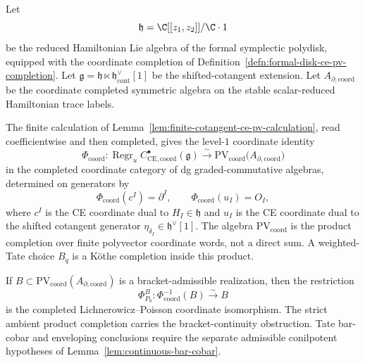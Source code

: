 \documentclass[11pt]{memoir}
\begin{document}
\begin{thm}
\label{thm:reduced-ce-pv-central-operation}
\label{thm:formal-disk-completed-ce-pv}
  Let
  \[
    \mathfrak h=\C[[z_1,z_2]]/\C\cdot1
  \]
  be the reduced Hamiltonian Lie algebra of the formal symplectic polydisk,
  equipped with the coordinate completion of
  Definition~\ref{defn:formal-disk-ce-pv-completion}.
  Let $\mathfrak g=\mathfrak h\ltimes\mathfrak h^\vee_{\mathrm{cont}}[1]$
  be the shifted-cotangent extension. Let
  \(A_{\partial,\mathrm{coord}}\) be the coordinate completed symmetric
  algebra on the stable scalar-reduced Hamiltonian trace labels.

  The finite calculation of
  Lemma~\ref{lem:finite-cotangent-ce-pv-calculation}, read
  coefficientwise and then completed, gives the level-\(1\) coordinate
  identity
  \[
    \Phi_{\mathrm{coord}}\colon
    \operatorname{Regr}_u C^\bullet_{\mathrm{CE},\mathrm{coord}}(\mathfrak g)
    \xrightarrow{\ \sim\ }
    \mathrm{PV}_{\mathrm{coord}}\bigl(A_{\partial,\mathrm{coord}}\bigr)
  \]
  in the completed coordinate category of dg graded-commutative
  algebras, determined on generators by
  \[
    \Phi_{\mathrm{coord}}(c^I)=\partial^I,\qquad
    \Phi_{\mathrm{coord}}(u_I)=O_I,
  \]
  where $c^I$ is the CE coordinate dual to $H_I\in\mathfrak h$ and
  $u_I$ is the CE coordinate dual to the shifted cotangent generator
  $\eta_{\delta_I}\in\mathfrak h^\vee[1]$.  The algebra
  \(\mathrm{PV}_{\mathrm{coord}}\) is the product completion over finite
  polyvector coordinate words, not a direct sum.  A weighted-Tate choice
  \(B_q\) is a K\"othe completion inside this product.

	  If \(B\subset\mathrm{PV}_{\mathrm{coord}}(A_{\partial,\mathrm{coord}})\) is a
	  bracket-admissible realization, then the restriction
	  \[
	    \Phi^B_{P_0}\colon\Phi_{\mathrm{coord}}^{-1}(B)
	    \xrightarrow{\sim}B
	  \]
		  is the completed Lichnerowicz--Poisson coordinate isomorphism.
		  The strict ambient product completion carries the bracket-continuity
		  obstruction.  Tate bar-cobar and enveloping conclusions require the separate admissible
		  conilpotent hypotheses of Lemma~\ref{lem:continuous-bar-cobar}.
\end{thm}
\end{document}
